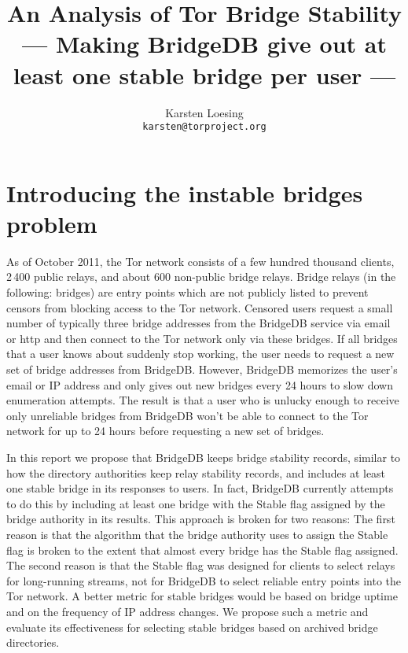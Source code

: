 \documentclass{article}
\begin{document}
\title{An Analysis of Tor Bridge Stability\\
{\large --- Making BridgeDB give out at least one stable bridge per
user ---}}
\author{Karsten Loesing\\{\tt karsten@torproject.org}}

\maketitle

\section{Introducing the instable bridges problem}

As of October 2011, the Tor network consists of a few hundred thousand
clients, 2\,400 public relays, and about 600 non-public bridge relays.
Bridge relays (in the following: bridges) are entry points which are not
publicly listed to prevent censors from blocking access to the Tor
network.
Censored users request a small number of typically three bridge addresses
from the BridgeDB service via email or http and then connect to the Tor
network only via these bridges.
If all bridges that a user knows about suddenly stop working, the user
needs to request a new set of bridge addresses from BridgeDB.
However, BridgeDB memorizes the user's email or IP address and only gives
out new bridges every 24 hours to slow down enumeration attempts.
The result is that a user who is unlucky enough to receive only unreliable
bridges from BridgeDB won't be able to connect to the Tor network for up
to 24 hours before requesting a new set of bridges.

In this report we propose that BridgeDB keeps bridge stability records,
similar to how the directory authorities keep relay stability records, and
includes at least one stable bridge in its responses to users.
In fact, BridgeDB currently attempts to do this by including at least one
bridge with the Stable flag assigned by the bridge authority in its
results.
This approach is broken for two reasons:
The first reason is that the algorithm that the bridge authority uses to
assign the Stable flag is broken to the extent that almost every bridge
has the Stable flag assigned.
The second reason is that the Stable flag was designed for clients to
select relays for long-running streams, not for BridgeDB to select
reliable entry points into the Tor network.
A better metric for stable bridges would be based on bridge uptime and on
the frequency of IP address changes.
We propose such a metric and evaluate its effectiveness for selecting
stable bridges based on archived bridge directories.
\end{document}
